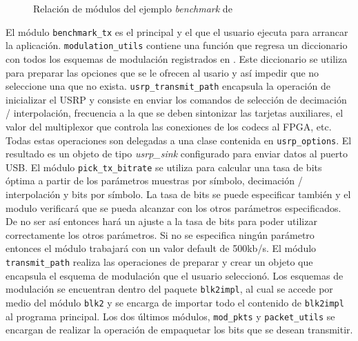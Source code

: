 \begin{figure}[htp]
\centering
{}
\vspace{0.5in}
\caption{Relaci\'on de m\'odulos del ejemplo \emph{benchmark} de \gnuradio}
\label{fig:relbench}
\end{figure}

El m\'odulo \verb|benchmark_tx| es el principal y el que el usuario ejecuta para arrancar la
aplicaci\'on. \verb|modulation_utils| contiene una funci\'on que regresa un diccionario con todos los
esquemas de modulaci\'on registrados en \gnuradio. Este diccionario se utiliza para preparar las
opciones que se le ofrecen al usario y as\'i impedir que no seleccione una que no exista.
\verb|usrp_transmit_path| encapsula la operaci\'on de inicializar el USRP y consiste en enviar los
comandos de selecci\'on de decimaci\'on / interpolaci\'on, frecuencia a la que se deben
sintonizar las tarjetas auxiliares, el valor del multiplexor que controla las conexiones de los codecs al FPGA,
etc. Todas estas operaciones son delegadas a una clase contenida en \verb|usrp_options|. El
resultado es un objeto de tipo \emph{usrp\_sink} configurado para enviar datos al puerto USB. El
m\'odulo \verb|pick_tx_bitrate| se utiliza para calcular una tasa de bits \'optima a partir de los
par\'ametros muestras por s\'imbolo, decimaci\'on / interpolaci\'on y bits por s\'imbolo.
La tasa de bits se puede especificar tambi\'en y el modulo verificar\'a que se pueda alcanzar con los otros
par\'ametros especificados. De no ser as\'i entonces har\'a un ajuste a la tasa de bits para poder
utilizar correctamente los otros par\'ametros. Si no se especifica ning\'un par\'ametro entonces el
m\'odulo trabajar\'a con un valor default de 500kb/s.
El m\'odulo \verb|transmit_path| realiza las operaciones de preparar y crear un objeto que encapsula
el esquema de modulaci\'on que el usuario seleccion\'o. Los esquemas de modulaci\'on se encuentran
dentro del paquete \verb|blk2impl|, al cual se accede por medio del m\'odulo \verb|blk2| y se
encarga de importar todo el contenido de \verb|blk2impl| al programa principal. Los dos \'ultimos
m\'odulos, \verb|mod_pkts| y \verb|packet_utils| se encargan de realizar la operaci\'on de
empaquetar los bits que se desean transmitir.

